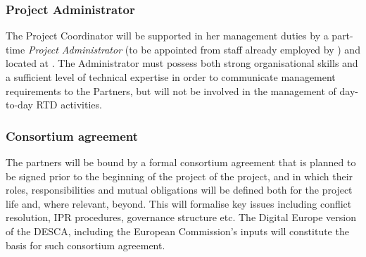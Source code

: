 \documentclass[a4paper,11pt]{article}
\begin{document}
\subsubsection*{Project Administrator}
\vspace{-6pt}

The Project Coordinator will be supported in her management
duties by a part-time \emph{Project Administrator} (to be appointed
from staff already employed by \SA{}) and located at \SA{}.  The Administrator
must possess both strong organisational skills and a
sufficient level of technical expertise in order to communicate
management requirements to the Partners, but will not be
involved in the management of day-to-day RTD activities.

\vspace{12pt}
\subsubsection*{Consortium agreement}
\vspace{-6pt}



The partners will be bound by a formal consortium agreement that is
planned to be signed prior to the beginning of the project of the project,
and in which their roles, responsibilities and mutual obligations will be
defined both for the project life and, where relevant, beyond.  This will
formalise key issues including conflict resolution, IPR procedures, governance structure
etc.  %
The Digital Europe version of the DESCA, including the European Commission's
inputs will constitute the basis for such consortium agreement.

\end{document}
